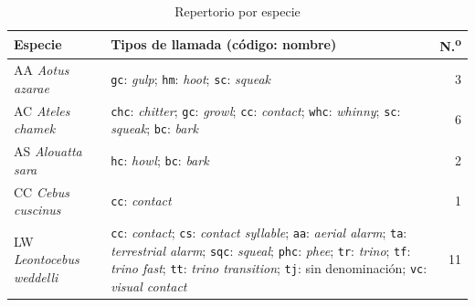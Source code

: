 \begin{table}[htbp]
    \centering
    \small
    \begin{threeparttable}
        \caption{Repertorio por especie}
        \label{tab:repertorio}
        \begin{tabular}{@{}L{2.6cm}L{10.4cm}r@{}}
            \toprule
            \textbf{Especie}                               & \textbf{Tipos de llamada (código: nombre)} & \textbf{N.\textsuperscript{o}} \\
            \midrule
            AA \textit{Aotus azarae}                       &
            \texttt{gc}: \textit{gulp};
            \texttt{hm}: \textit{hoot};
            \texttt{sc}: \textit{squeak}                   & 3                                                                           \\
            \addlinespace
            AC \textit{Ateles chamek}                      &
            \texttt{chc}: \textit{chitter};
            \texttt{gc}: \textit{growl};
            \texttt{cc}: \textit{contact};
            \texttt{whc}: \textit{whinny};
            \texttt{sc}: \textit{squeak};
            \texttt{bc}: \textit{bark}                     & 6                                                                           \\
            \addlinespace
            AS \textit{Alouatta sara}                      &
            \texttt{hc}: \textit{howl};
            \texttt{bc}: \textit{bark}                     & 2                                                                           \\
            \addlinespace
            CC \textit{Cebus cuscinus}                     &
            \texttt{cc}: \textit{contact}                  & 1                                                                           \\
            \addlinespace
            LW \textit{Leontocebus weddelli}               &
            \texttt{cc}: \textit{contact};
            \texttt{cs}: \textit{contact syllable};
            \texttt{aa}: \textit{aerial alarm};
            \texttt{ta}: \textit{terrestrial alarm};
            \texttt{sqc}: \textit{squeal};
            \texttt{phc}: \textit{phee};
            \texttt{tr}: \textit{trino};
            \texttt{tf}: \textit{trino fast};
            \texttt{tt}: \textit{trino transition};
            \texttt{tj}: sin denominación\tnote{$\dagger$};
            \texttt{vc}: \textit{visual contact}           & 11                                                                          \\

\end{tabular}
\end{threeparttable}
\end{table}
